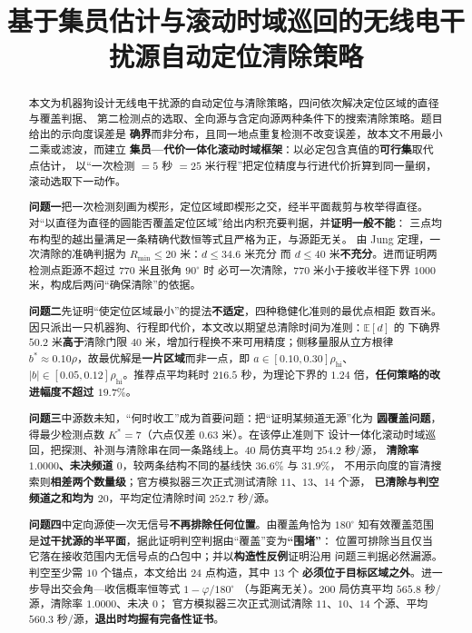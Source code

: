 \documentclass[withoutpreface, bwprint]{cumcmthesis}
\title{基于集员估计与滚动时域巡回的无线电干扰源自动定位清除策略}
\begin{document}
\maketitle

\begin{abstract}
本文为机器狗设计无线电干扰源的自动定位与清除策略，四问依次解决定位区域的直径与覆盖判据、
第二检测点的选取、全向源与含定向源两种条件下的搜索清除策略。题目给出的示向度误差是
\textbf{确界}而非分布，且同一地点重复检测不改变误差，故本文不用最小二乘或滤波，而建立
\textbf{集员—代价一体化滚动时域框架}：以必定包含真值的\textbf{可行集}取代点估计，
以“一次检测 $=5$ 秒 $=25$ 米行程”把定位精度与行进代价折算到同一量纲，滚动选取下一动作。

\textbf{问题一}把一次检测刻画为楔形，定位区域即楔形之交，经半平面裁剪与枚举得直径。
对“以直径为直径的圆能否覆盖定位区域”给出内积充要判据，并\textbf{证明一般不能}：
三点均布构型的越出量满足一条精确代数恒等式且严格为正，与源距无关。
由 Jung 定理，一次清除的准确判据为 $R_{\min}\le20$ 米：$d\le34.6$ 米充分
而 $d\le40$ 米\textbf{不充分}。进而证明两检测点距源不超过 $770$ 米且张角 $90^\circ$ 时
必可一次清除，$770$ 米小于接收半径下界 $1000$ 米，构成后两问“确保清除”的依据。

\textbf{问题二}先证明“使定位区域最小”的提法\textbf{不适定}，四种稳健化准则的最优点相距
数百米。因只派出一只机器狗、行程即代价，本文改以期望总清除时间为准则：$\mathbb{E}[d]$ 的
下确界 $50.2$ 米\textbf{高于}清除门限 $40$ 米，增加行程换不来可用精度；侧移量服从立方根律
$b^{*}\approx0.10\rho$，故最优解是\textbf{一片区域}而非一点，即 $a\in[0.10,0.30]\rho_{\mathrm{hi}}$、
$\lvert b\rvert\in[0.05,0.12]\rho_{\mathrm{hi}}$。推荐点平均耗时 $216.5$ 秒，为理论下界的
$1.24$ 倍，\textbf{任何策略的改进幅度不超过 $19.7\%$}。

\textbf{问题三}中源数未知，“何时收工”成为首要问题：把“证明某频道无源”化为
\textbf{圆覆盖问题}，得最少检测点数 $K^{*}=7$（六点仅差 $0.63$ 米）。在该停止准则下
设计一体化滚动时域巡回，把探测、补测与清除串在同一条路线上。$40$ 局仿真平均 $254.2$ 秒/源，
\textbf{清除率 $1.0000$、未决频道 $0$}，较两条结构不同的基线快 $36.6\%$ 与 $31.9\%$，
不用示向度的盲清搜索则\textbf{相差两个数量级}；官方模拟器三次正式测试清除 $11$、$13$、$14$ 个源，
\textbf{已清除与判空频道之和均为 $20$}，平均定位清除时间 $252.7$ 秒/源。

\textbf{问题四}中定向源使一次无信号\textbf{不再排除任何位置}。由覆盖角恰为 $180^\circ$
知有效覆盖范围是\textbf{过干扰源的半平面}，据此证明判空判据由“覆盖”变为\textbf{“围堵”}：
位置可排除当且仅当它落在接收范围内无信号点的凸包中；并以\textbf{构造性反例}证明沿用
问题三判据必然漏源。判空至少需 $10$ 个锚点，本文给出 $24$ 点构造，其中 $13$ 个
\textbf{必须位于目标区域之外}。进一步导出交会角—收信概率恒等式 $1-\varphi/180^{\circ}$
（与距离无关）。$200$ 局仿真平均 $565.8$ 秒/源，清除率 $1.0000$、未决 $0$；
官方模拟器三次正式测试清除 $11$、$10$、$14$ 个源、平均 $560.3$ 秒/源，\textbf{退出时均握有完备性证书}。


\end{abstract}
\end{document}
